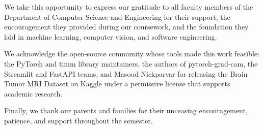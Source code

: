 \documentclass[12pt,a4paper,oneside]{report}
\begin{document}
\vspace{0.5cm}

We take this opportunity to express our gratitude to all faculty members of the Department
of Computer Science and Engineering for their support, the encouragement they provided
during our coursework, and the foundation they laid in machine learning, computer vision,
and software engineering.

\vspace{0.5cm}

We acknowledge the open-source community whose tools made this work feasible: the PyTorch
and timm library maintainers, the authors of pytorch-grad-cam, the Streamlit and FastAPI
teams, and Masoud Nickparvar for releasing the Brain Tumor MRI Dataset on Kaggle under a
permissive license that supports academic research.

\vspace{0.5cm}

Finally, we thank our parents and families for their unceasing encouragement, patience,
and support throughout the semester.

\newpage
\thispagestyle{empty}
\mbox{}

\end{document}

